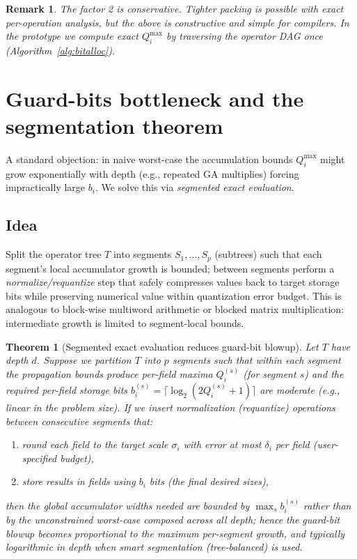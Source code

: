 \documentclass[11pt]{article}
\theoremstyle{definition}
\theoremstyle{plain}
\newtheorem{theorem}{Theorem}[section]
\newtheorem{remark}{Remark}[section]
\begin{document}
\begin{remark}
The factor 2 is conservative. Tighter packing is possible with exact per-operation analysis, but the above is constructive and simple for compilers. In the prototype we compute exact \(Q_i^{\max}\) by traversing the operator DAG once (Algorithm~\ref{alg:bitalloc}).
\end{remark}

\section{Guard-bits bottleneck and the segmentation theorem}
\label{sec:segmented}
A standard objection: in naive worst-case the accumulation bounds \(Q_i^{\max}\) might grow exponentially with depth (e.g., repeated GA multiplies) forcing impractically large \(b_i\). We solve this via \emph{segmented exact evaluation}.

\subsection{Idea}
Split the operator tree \(T\) into segments \(S_1,\dots,S_p\) (subtrees) such that each segment's local accumulator growth is bounded; between segments perform a \emph{normalize/requantize} step that safely compresses values back to target storage bits while preserving numerical value within quantization error budget. This is analogous to block-wise multiword arithmetic or blocked matrix multiplication: intermediate growth is limited to segment-local bounds.

\begin{theorem}[Segmented exact evaluation reduces guard-bit blowup]\label{thm:segmented}
Let \(T\) have depth \(d\). Suppose we partition \(T\) into \(p\) segments such that within each segment the propagation bounds produce per-field maxima \(Q_i^{(s)}\) (for segment \(s\)) and the required per-field storage bits \(b_i^{(s)} = \lceil \log_2(2Q_i^{(s)}+1)\rceil\) are moderate (e.g., linear in the problem size). If we insert normalization (requantize) operations between consecutive segments that:
\begin{enumerate}
  \item round each field to the target scale \(\sigma_i\) with error at most \(\delta_i\) per field (user-specified budget),
  \item store results in fields using \(b_i\) bits (the final desired sizes),
\end{enumerate}
then the global accumulator widths needed are bounded by \(\max_s b_i^{(s)}\) rather than by the unconstrained worst-case composed across all depth; hence the guard-bit blowup becomes proportional to the maximum per-segment growth, and typically logarithmic in depth when smart segmentation (tree-balanced) is used.
\end{theorem}
\end{document}
